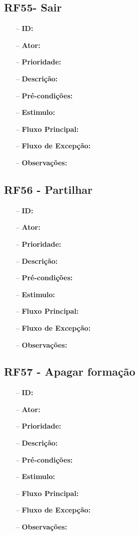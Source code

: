 \subsection{RF55- Sair}
\begin{itemize}
	\item[--] \textbf{ID:} 
	\item[--]  \textbf{Ator:} 
	\item[--]  \textbf{Prioridade:} 
	\item[--]  \textbf{Descrição:} 
	\item[--]  \textbf{Pré-condições:} 
	\item[--]  \textbf{Estimulo:}
	\item[--]  \textbf{Fluxo Principal:} 
	\subitem
	\subitem
	\subitem
	\subitem
	\item[--]  \textbf{Fluxo de Excepção:} 
	\subitem
	\subitem
	\subitem
	\subitem
	\item[--]  \textbf{Observações:} 
\end{itemize}
\newpage

\subsection{RF56 - Partilhar}
\begin{itemize}
	\item[--] \textbf{ID:} 
	\item[--]  \textbf{Ator:} 
	\item[--]  \textbf{Prioridade:} 
	\item[--]  \textbf{Descrição:} 
	\item[--]  \textbf{Pré-condições:} 
	\item[--]  \textbf{Estimulo:}
	\item[--]  \textbf{Fluxo Principal:} 
	\subitem
	\subitem
	\subitem
	\subitem
	\item[--]  \textbf{Fluxo de Excepção:} 
	\subitem
	\subitem
	\subitem
	\subitem
	\item[--]  \textbf{Observações:} 
\end{itemize}
\newpage

\subsection{RF57 - Apagar formação}
\begin{itemize}
	\item[--] \textbf{ID:} 
	\item[--]  \textbf{Ator:} 
	\item[--]  \textbf{Prioridade:} 
	\item[--]  \textbf{Descrição:} 
	\item[--]  \textbf{Pré-condições:} 
	\item[--]  \textbf{Estimulo:}
	\item[--]  \textbf{Fluxo Principal:} 
	\subitem
	\subitem
	\subitem
	\subitem
	\item[--]  \textbf{Fluxo de Excepção:} 
	\subitem
	\subitem
	\subitem
	\subitem
	\item[--]  \textbf{Observações:} 
\end{itemize}
\newpage

